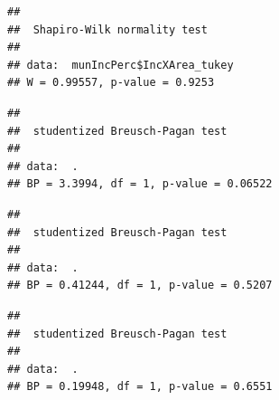 \documentclass[11pt,]{article}
\newenvironment{Shaded}{\begin{snugshade}}{\end{snugshade}}
\newcommand{\KeywordTok}[1]{\textcolor[rgb]{0.13,0.29,0.53}{\textbf{#1}}}
\newcommand{\StringTok}[1]{\textcolor[rgb]{0.31,0.60,0.02}{#1}}
\newcommand{\OperatorTok}[1]{\textcolor[rgb]{0.81,0.36,0.00}{\textbf{#1}}}
\newcommand{\NormalTok}[1]{#1}
\begin{document}
\begin{Shaded}
\end{Shaded}

\begin{verbatim}
## 
##  Shapiro-Wilk normality test
## 
## data:  munIncPerc$IncXArea_tukey
## W = 0.99557, p-value = 0.9253
\end{verbatim}

\begin{Shaded}
\end{Shaded}

\begin{verbatim}
## 
##  studentized Breusch-Pagan test
## 
## data:  .
## BP = 3.3994, df = 1, p-value = 0.06522
\end{verbatim}

\begin{Shaded}
\end{Shaded}

\begin{verbatim}
## 
##  studentized Breusch-Pagan test
## 
## data:  .
## BP = 0.41244, df = 1, p-value = 0.5207
\end{verbatim}

\begin{Shaded}
\end{Shaded}

\begin{verbatim}
## 
##  studentized Breusch-Pagan test
## 
## data:  .
## BP = 0.19948, df = 1, p-value = 0.6551
\end{verbatim}
\end{document}
